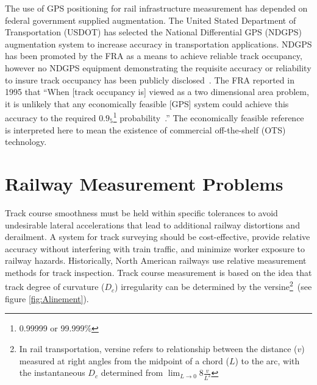 The use of GPS positioning for rail infrastructure measurement has depended on federal government supplied augmentation. The United Stated Department of Transportation (USDOT) has selected the National Differential GPS (NDGPS) augmentation system to increase accuracy in transportation applications. NDGPS has been promoted by the FRA as a means to achieve reliable track occupancy, however no NDGPS equipment demonstrating the requisite accuracy or reliability to insure track occupancy has been publicly disclosed~\citep{2006AllenAssetMap}. The FRA reported in 1995 that ``When [track occupancy is] viewed as a two dimensional area problem, it is unlikely that any economically feasible [GPS] system could achieve this accuracy to the required $0.9_5$\footnote{0.99999 or 99.999\%} probability~\citep[pp.6-7]{1995FRADiffe}.'' The economically feasible reference is interpreted here to mean the existence of commercial off-the-shelf (OTS) technology.


\section{Railway Measurement Problems}
Track course smoothness must be held within specific tolerances to avoid undesirable lateral accelerations that lead to additional railway distortions and derailment. A system for track surveying should be cost-effective, provide relative accuracy without interfering with train traffic, and minimize worker exposure to railway hazards. Historically, North American railways use relative measurement methods for track inspection. Track course measurement is based on the idea that track degree of curvature ($D_c$) irregularity can be determined by the versine\footnote{In rail transportation, versine refers to relationship between the distance ($v$) measured at right angles from the midpoint of a chord ($L$) to the arc, with the instantaneous  $D_c$ determined from $\displaystyle\lim_{L\to0} 8\frac{v}{L^2}$}~\citep{Nair}(see figure \ref{fig:Alinement}).


